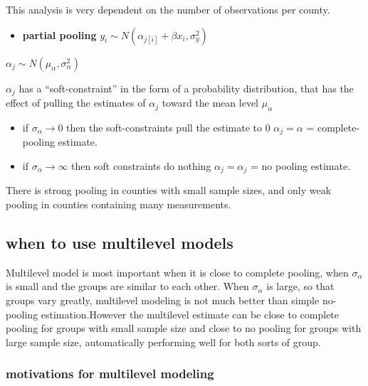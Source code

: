 \documentclass[
]{article}
\providecommand{\tightlist}{%
  \setlength{\itemsep}{0pt}\setlength{\parskip}{0pt}}
\begin{document}
This analysis is very dependent on the number of observations per
county.

\begin{itemize}
\tightlist
\item
  \textbf{partial pooling}
  \(y_i \sim N(\alpha_{j[i]} +\beta x_i, \sigma_y^2)\)
\end{itemize}

\(\alpha_{j} \sim N(\mu_{\alpha}, \sigma_{\alpha}^2)\)

\(\alpha_{j}\) has a ``soft-constraint'' in the form of a probability
distribution, that has the effect of pulling the estimates of
\(\alpha_{j}\) toward the mean level \(\mu_{\alpha}\)

\begin{itemize}
\item
  if \(\sigma_{\alpha} \to 0\) then the soft-constraints pull the
  estimate to 0 \(\alpha_j = \alpha\) = complete-pooling estimate.
\item
  if \(\sigma_{\alpha} \to \infty\) then soft constraints do nothing
  \(\alpha_j = \alpha_j\) = no pooling estimate.
\end{itemize}

There is strong pooling in counties with small sample sizes, and only
weak pooling in counties containing many measurements.

\hypertarget{when-to-use-multilevel-models}{%
\subsection{when to use multilevel
models}\label{when-to-use-multilevel-models}}

Multilevel model is most important when it is close to complete pooling,
when \(\sigma_{\alpha}\) is small and the groups are similar to each
other. When \(\sigma_{\alpha}\) is large, so that groups vary greatly,
multilevel modeling is not much better than simple no-pooling
estimation.However the multilevel estimate can be close to complete
pooling for groups with small sample size and close to no pooling for
groups with large sample size, automatically performing well for both
sorts of group.

\hypertarget{motivations-for-multilevel-modeling}{%
\subsubsection{motivations for multilevel
modeling}\label{motivations-for-multilevel-modeling}}
\end{document}
